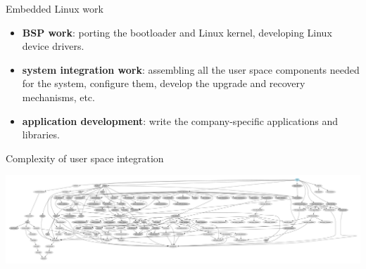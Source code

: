 \begin{frame}{Embedded Linux work}
  \begin{itemize}
  \item {\bf BSP work}: porting the bootloader and Linux kernel,
    developing Linux device drivers.
  \item {\bf system integration work}: assembling all the user space
    components needed for the system, configure them, develop the
    upgrade and recovery mechanisms, etc.
  \item {\bf application development}: write the company-specific
    applications and libraries.
  \end{itemize}
\end{frame}

\begin{frame}{Complexity of user space integration}
  \begin{center}
    \includegraphics[height=0.85\textheight,width=\textwidth]{slides/buildroot-yocto-introduction/graph-depends.pdf}
  \end{center}
\end{frame}

